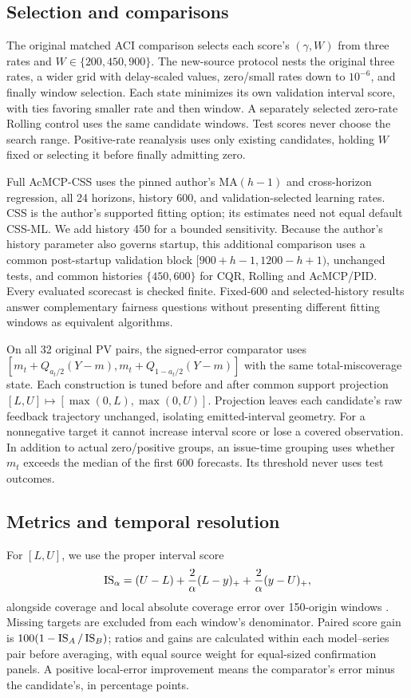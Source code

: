 \subsection{Selection and comparisons}
The original matched ACI comparison selects each score's $(\gamma,W)$ from three
rates and $W\in\{200,450,900\}$. The new-source protocol nests the original three
rates, a wider grid with delay-scaled values, zero/small rates down to $10^{-6}$,
and finally window selection. Each state minimizes its own validation interval
score, with ties favoring smaller rate and then window. A separately selected
zero-rate Rolling control uses the same candidate windows. Test scores never
choose the search range. Positive-rate reanalysis uses only existing candidates,
holding $W$ fixed or selecting it before finally admitting zero.

Full AcMCP-CSS uses the pinned author's MA$(h-1)$ and cross-horizon regression,
all 24 horizons, history 600, and validation-selected learning rates. CSS is the
author's supported fitting option; its estimates need not equal default CSS-ML.
We add history 450 for a bounded sensitivity. Because the author's history parameter
also governs startup, this additional comparison uses a common post-startup
validation block $[900+h-1,1200-h+1)$, unchanged tests, and common histories
$\{450,600\}$ for CQR, Rolling and AcMCP/PID. Every evaluated scorecast is checked
finite. Fixed-600 and selected-history results answer complementary fairness
questions without presenting different fitting windows as equivalent algorithms.

On all 32 original PV pairs, the signed-error comparator uses
$[m_t+Q_{a_t/2}(Y-m),m_t+Q_{1-a_t/2}(Y-m)]$ with the same total-miscoverage state.
Each construction is tuned before and after common support projection
$[L,U]\mapsto[\max(0,L),\max(0,U)]$. Projection leaves each candidate's raw feedback
trajectory unchanged, isolating emitted-interval geometry. For a nonnegative target
it cannot increase interval score or lose a covered observation. In addition to
actual zero/positive groups, an issue-time grouping uses whether $m_t$ exceeds
the median of the first 600 forecasts. Its threshold never uses test outcomes.

\subsection{Metrics and temporal resolution}
For $[L,U]$, we use the proper interval score
\begin{equation}
\operatorname{IS}_\alpha=(U-L)+\frac{2}{\alpha}(L-y)_++\frac{2}{\alpha}(y-U)_+,
\end{equation}
alongside coverage and local absolute coverage error over 150-origin windows
\citep{winkler1972,gneiting2007proper}. Missing targets are excluded from each
window's denominator. Paired score gain is $100(1-\operatorname{IS}_A/\operatorname{IS}_B)$; ratios and gains
are calculated within each model--series pair before averaging, with equal source
weight for equal-sized confirmation panels. A positive local-error improvement
means the comparator's error minus the candidate's, in percentage points.

